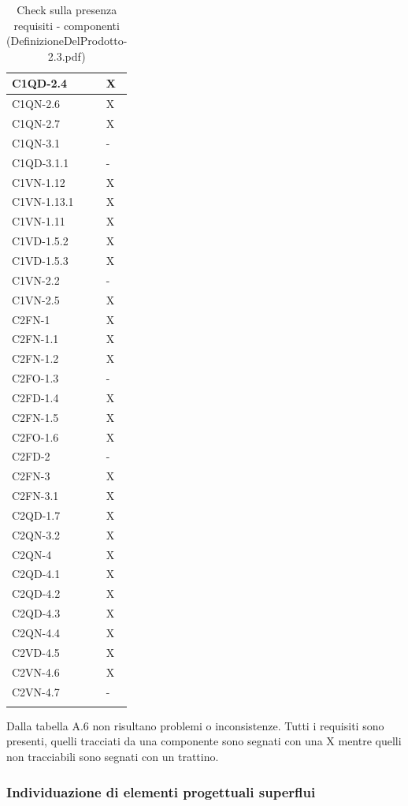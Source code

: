 \begin{footnotesize}
\begin{longtable}{|p{}|p{}|}
 C1QD-2.4&X  \\ \hline
 C1QN-2.6&X  \\ \hline
 C1QN-2.7&X    \\ \hline
 C1QN-3.1&-   \\ \hline
 C1QD-3.1.1&-    \\ \hline
 C1VN-1.12&X \\ \hline
 C1VN-1.13.1&X  \\ \hline
 C1VN-1.11&X  \\ \hline
 C1VD-1.5.2&X \\ \hline
 C1VD-1.5.3&X   \\ \hline
 C1VN-2.2&- \\ \hline
 C1VN-2.5&X  \\ \hline
 C2FN-1&X    \\ \hline
 C2FN-1.1&X    \\ \hline
 C2FN-1.2&X   \\ \hline
 C2FO-1.3&-    \\ \hline
 C2FD-1.4&X   \\ \hline
 C2FN-1.5&X   \\ \hline
 C2FO-1.6&X   \\ \hline
 C2FD-2&-    \\ \hline
 C2FN-3&X   \\ \hline
 C2FN-3.1&X   \\ \hline
 C2QD-1.7&X   \\ \hline
 C2QN-3.2&X   \\ \hline
 C2QN-4 &X  \\ \hline
 C2QD-4.1&X    \\ \hline
 C2QD-4.2&X   \\ \hline
 C2QD-4.3&X   \\ \hline
 C2QN-4.4&X  \\ \hline
 C2VD-4.5&X   \\ \hline
 C2VN-4.6&X    \\ \hline
 C2VN-4.7&-  \\ \hline

\caption{Check sulla presenza requisiti - componenti
(DefinizioneDelProdotto-2.3.pdf)}
\end{longtable}
\end{footnotesize}

Dalla tabella A.6 non risultano problemi o inconsistenze. Tutti i requisiti sono
presenti, quelli tracciati da una componente sono segnati con una X mentre
quelli non tracciabili sono segnati con un trattino.

\subsubsection*{Individuazione di elementi progettuali superflui}

